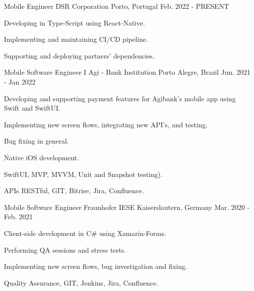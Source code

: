 

\begin{cventries}
    \cventry
      {Mobile Engineer} %
      {DSR Corporation} %
      {Porto, Portugal} %
      {Feb. 2022 - PRESENT} %
      {
      \begin{cvitems} %
        \item {Developing in Type-Script using React-Native.}
        \item {Implementing and maintaining CI/CD pipeline.}
        \item {Supporting and deploying partners' dependencies.}
        \end{cvitems}
      }

    \cventry
      {Mobile Software Engineer I} %
      {Agi - Bank Institution} %
      {Porto Alegre, Brazil} %
      {Jun. 2021 - Jan 2022} %
      {
      \begin{cvitems} %
        \item {Developing and supporting payment features for Agibank's mobile app using Swift and SwiftUI.}
        \item {Implementing new screen flows, integrating new API's, and testing.}
        \item {Bug fixing in general.}
        \item {Native iOS development.}
        \item {SwiftUI, MVP, MVVM, Unit and Snapshot testing).}
        \item {APIs RESTful, GIT, Bitrise, Jira, Confluence.}
      \end{cvitems}
      }

      \cventry
      {Mobile Software Engineer} %
      {Fraunhofer IESE} %
      {Kaiserslautern, Germany} %
      {Mar. 2020 - Feb. 2021} %
      {
      \begin{cvitems} %
        \item {Client-side development in C\# using Xamarin-Forms.}
        \item {Performing QA sessions and stress tests.}
        \item {Implementing new screen flows, bug investigation and fixing.}
        \item {Quality Assurance, GIT, Jenkins, Jira, Confluence.}
      \end{cvitems}
    }


\end{cventries}
